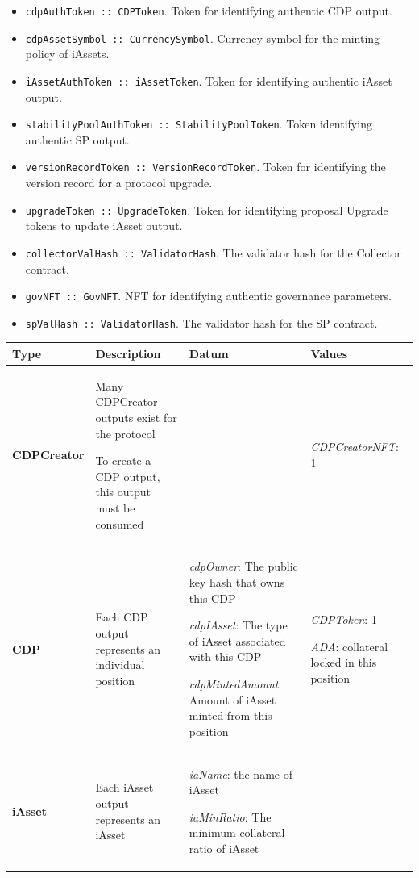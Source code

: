 \documentclass{article}
\begin{document}
\begin{sloppypar}
\begin{itemize}
\item
  \texttt{cdpAuthToken~::~CDPToken}. Token for identifying authentic CDP
  output.
\item
  \texttt{cdpAssetSymbol~::~CurrencySymbol}. Currency symbol for the
  minting policy of iAssets.
\item
  \texttt{iAssetAuthToken~::~iAssetToken}. Token for identifying
  authentic iAsset output.
\item
  \texttt{stabilityPoolAuthToken~::~StabilityPoolToken}. Token
  identifying authentic SP output.
\item
  \texttt{versionRecordToken~::~VersionRecordToken}. Token for
  identifying the version record for a protocol upgrade.
\item
  \texttt{upgradeToken~::~UpgradeToken}. Token for identifying proposal
  Upgrade tokens to update iAsset output.
\item
  \texttt{collectorValHash~::~ValidatorHash}. The validator hash for the
  Collector contract.
\item
  \texttt{govNFT~::~GovNFT}. NFT for identifying authentic governance
  parameters.
\item
  \texttt{spValHash~::~ValidatorHash}. The validator hash for the SP
  contract.
\end{itemize}

\begin{tabularx}{\linewidth}{l|L|L|L}
\caption{CDP outputs}
\tabularnewline
\toprule
\textbf{Type} & \textbf{Description} & \textbf{Datum} &
\textbf{Values}
\tabularnewline
\midrule
\endhead
\textbf{CDPCreator}
&
Many CDPCreator outputs exist for the protocol

To create a CDP output, this output must be consumed
&

&
\emph{CDPCreatorNFT}: 1
\tabularnewline
\midrule
\textbf{CDP}
&
Each CDP output represents an individual position
&
\emph{cdpOwner}: The public key hash that owns this CDP

\emph{cdpIAsset}: The type of iAsset associated with this CDP

\emph{cdpMintedAmount}: Amount of iAsset minted from this position
&
\emph{CDPToken}: 1

\emph{ADA}: collateral locked in this position
\tabularnewline
\midrule
\textbf{iAsset}
&
Each iAsset output represents an iAsset
&
\emph{iaName}: the name of iAsset

\emph{iaMinRatio}: The minimum collateral ratio of iAsset


\end{tabularx}
\end{sloppypar}
\end{document}
